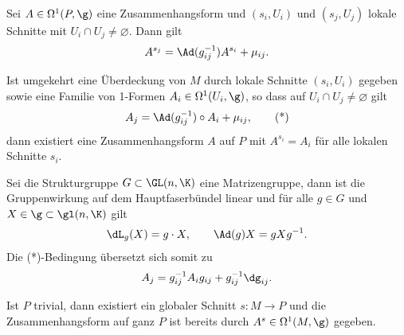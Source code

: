 \documentclass[%
	paper=a5,%
	fleqn,%
	DIV=18,%
	BCOR=0mm,
	fontsize=11pt,
	titlepage=false,%
	bibliography=totoc,
	DIV=18,%
	twoside=true,
	pdftitle=Riemannsche Geometrie,
	pdfauthor=Uwe Semmelmann,
	numbers=noendperiod]%
	{scrbook}
\begin{document}
\begin{prop}
\begin{propenum}
\item
Sei $A\in \Omega^1(P,\g)$ eine Zusammenhangsform und $(s_i,U_i)$ und $(s_j,U_j)$
lokale Schnitte mit $U_i\cap U_j\neq \varnothing$. Dann gilt
\begin{align*}
A^{s_j} = \Ad(g_{ij}^{-1})A^{s_i} + \mu_{ij}.
\end{align*}
\item Ist umgekehrt eine Überdeckung von $M$ durch lokale Schnitte $(s_i,U_i)$
gegeben sowie eine Familie von 1-Formen $A_i\in \Omega^1(U_i,\g)$, so dass auf
$U_i\cap U_j\neq \varnothing$ gilt
\begin{align*}
A_j = \Ad(g_{ij}^{-1})\circ A_i + \mu_{ij},\tag{*}
\end{align*}
dann existiert eine Zusammenhangsform $A$ auf $P$ mit $A^{s_i} = A_i$ für alle
lokalen Schnitte $s_i$.\fish
\end{propenum}
\end{prop}

\begin{rem}[Spezialfälle.]
\begin{remenum}
\item Sei die Strukturgruppe $G\subset \GL(n,\K)$ eine Matrizengruppe, dann ist
die Gruppenwirkung auf dem Hauptfaserbündel linear und für alle $g\in G$ und
$X\in\g \subset \gl(n,\K)$ gilt
\begin{align*}
\dL_g(X) = g\cdot X,\qquad \Ad(g)X = gXg^{-1}.
\end{align*}
Die (*)-Bedingung übersetzt sich somit zu
\begin{align*}
A_j = g_{ij}^{-1}A_i g_{ij} + g_{ij}^{-1}\dg_{ij}.
\end{align*}
\item Ist $P$ trivial, dann existiert ein globaler Schnitt $s\colon M\to P$ und die
Zusammenhangsform auf ganz $P$ ist bereits  durch $A^s\in
\Omega^1(M,\g)$ gegeben.\map
\end{remenum}
\end{rem}
\end{document}
